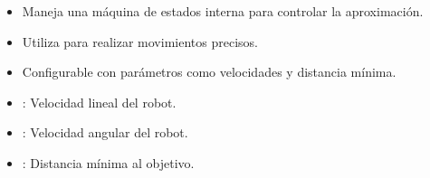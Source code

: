 \documentclass[a4paper,10pt,spanish]{sphinxmanual}
\begin{document}
\sphinxAtStartPar
{}
\begin{itemize}
\item {} 
\sphinxAtStartPar
Maneja una máquina de estados interna para controlar la aproximación.

\item {} 
\sphinxAtStartPar
Utiliza  para realizar movimientos precisos.

\item {} 
\sphinxAtStartPar
Configurable con parámetros como velocidades y distancia mínima.

\end{itemize}

\sphinxAtStartPar
{}
\begin{itemize}
\item {} 
\sphinxAtStartPar
{}: Velocidad lineal del robot.

\item {} 
\sphinxAtStartPar
{}: Velocidad angular del robot.

\item {} 
\sphinxAtStartPar
{}: Distancia mínima al objetivo.

\end{itemize}
\label{\detokenize{squad_approach_control_action:module-squad_approach_control_action}}
\end{document}
